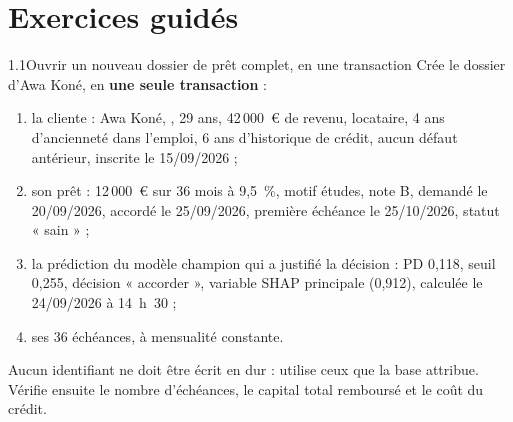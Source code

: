 \section{Exercices guidés}

\begin{exercice}{1.1}{Ouvrir un nouveau dossier de prêt complet, en une transaction}
Crée le dossier d'Awa Koné, en \textbf{une seule transaction} :
\begin{enumerate}
\item la cliente : Awa Koné, , 29 ans, 42\,000~€ de revenu, locataire,
4 ans d'ancienneté dans l'emploi, 6 ans d'historique de crédit, aucun défaut antérieur, inscrite le
15/09/2026 ;
\item son prêt : 12\,000~€ sur 36 mois à 9,5~\%, motif études, note B, demandé le 20/09/2026, accordé
le 25/09/2026, première échéance le 25/10/2026, statut « sain » ;
\item la prédiction du modèle champion  qui a justifié la décision : PD
0,118, seuil 0,255, décision « accorder », variable SHAP principale  (0,912), calculée
le 24/09/2026 à 14~h~30 ;
\item ses 36 échéances, à mensualité constante.
\end{enumerate}
Aucun identifiant ne doit être écrit en dur : utilise ceux que la base attribue. Vérifie ensuite le
nombre d'échéances, le capital total remboursé et le coût du crédit.
\end{exercice}

